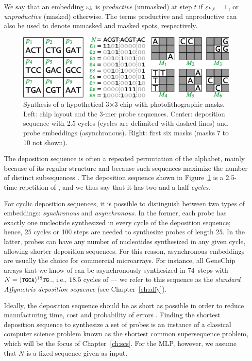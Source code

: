 We say that an embedding $\varepsilon_k$ is \emph{productive} (unmasked) at step $t$ if
$\varepsilon_{k,t} = 1$, or \emph{unproductive} (masked) otherwise. The terms
productive and unproductive can also be used to denote unmasked and masked
spots, respectively.

\begin{figure}[t]\centering
\centerline{\includegraphics[width=\textwidth]{figures/chip.eps}}
\caption{Synthesis of a hypothetical 3$\times$3 chip with photolithographic
  masks. Left: chip layout and the 3-mer probe sequences. Center: deposition
  sequence with 2.5 cycles (cycles are delimited with dashed lines) and probe
  embeddings (asynchronous). Right: first six masks (masks 7 to 10 not shown).}
\label{fig:masking_process}
\end{figure}

The deposition sequence is often a repeated permutation of the alphabet, mainly
because of its regular structure and because such sequences maximize the number
of distinct subsequences \citep{Chase1976}. The deposition sequence shown in
Figure~\ref{fig:masking_process} is a 2.5-time repetition of , and we
thus say that it has two and a half \emph{cycles}.

For cyclic deposition sequences, it is possible to distinguish between two types
of embeddings: \emph{synchronous} and \emph{asynchronous}. In the former, each
probe has exactly one nucleotide synthesized in every cycle of the deposition
sequence; hence, 25 cycles or 100 steps are needed to synthesize probes of
length 25. In the latter, probes can have any number of nucleotides synthesized
in any given cycle, allowing shorter deposition sequences. For this reason,
asynchronous embeddings are usually the choice for commercial microarrays.  For
instance, all GeneChip arrays that we know of can be asynchronously synthesized
in 74~steps with $N=({\text{\small{\tt{TGCA}}}})^{18}{\text{\small{\tt{TG}}}}$., i.e., $18.5$ cycles of
 --- we refer to this sequence as the \emph{standard Affymetrix
deposition sequence} (see Chapter~\ref{ch:affy}).

Ideally, the deposition sequence should be as short as possible in order to
reduce manufacturing time, cost and probability of errors \citep{Rahmann2003}.
Finding the shortest deposition sequence to synthesize a set of probes is an
instance of a classical computer science problem known as the shortest common
supersequence problem, which will be the focus of Chapter~\ref{ch:scs}. For the
MLP, however, we assume that $N$ is a fixed sequence given as input.

